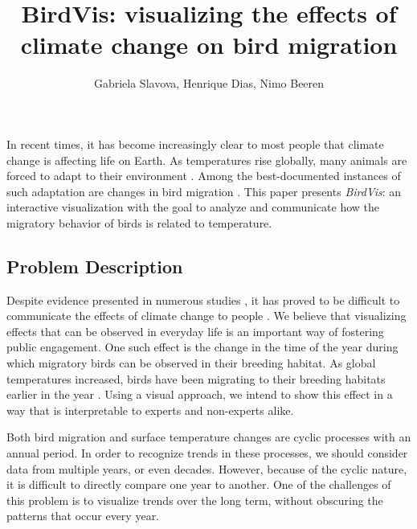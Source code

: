 \documentclass[journal]{vgtc}                %
\title{BirdVis: visualizing the effects of climate change on bird migration}
\author{Gabriela Slavova, Henrique Dias, Nimo Beeren}
\begin{document}


\maketitle

In recent times, it has become increasingly clear to most people that climate change is affecting life on Earth. As temperatures rise globally, many animals are forced to adapt to their environment \cite{parmesan2007pheno,root2003fingerprints}. Among the best-documented instances of such adaptation are changes in bird migration \cite{miller2008bird,cotton2003avian,jenni2003timing}. This paper presents \emph{BirdVis}: an interactive visualization with the goal to analyze and communicate how the migratory behavior of birds is related to temperature.

\subsection{Problem Description}

Despite evidence presented in numerous studies \cite{solomon2007climate,parry2007climate}, it has proved to be difficult to communicate the effects of climate change to people \cite{moser2011communicating}. We believe that visualizing effects that can be observed in everyday life is an important way of fostering public engagement. One such effect is the change in the time of the year during which migratory birds can be observed in their breeding habitat. As global temperatures increased, birds have been migrating to their breeding habitats earlier in the year \cite{jenni2003timing}. Using a visual approach, we intend to show this effect in a way that is interpretable to experts and non-experts alike.

Both bird migration and surface temperature changes are cyclic processes with an annual period. In order to recognize trends in these processes, we should consider data from multiple years, or even decades. However, because of the cyclic nature, it is difficult to directly compare one year to another. One of the challenges of this problem is to visualize trends over the long term, without obscuring the patterns that occur every year.
\end{document}
